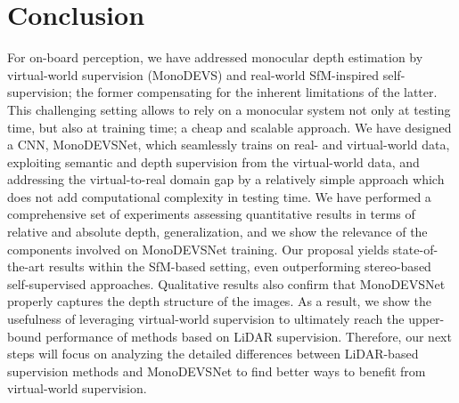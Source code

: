 \documentclass[journal]{IEEEtran}
\begin{document}
\section{Conclusion}
\label{sec:conclusion}
For on-board perception, we have addressed monocular depth estimation by virtual-world supervision (MonoDEVS) and real-world SfM-inspired self-supervision; the former compensating for the inherent limitations of the latter. This challenging setting allows to rely on a monocular system not only at testing time, but also at training time; a cheap and scalable approach. We have designed a CNN, MonoDEVSNet, which seamlessly trains on real- and virtual-world data, exploiting semantic and depth supervision from the virtual-world data, and addressing the virtual-to-real domain gap by a relatively simple approach which does not add computational complexity in testing time. We have performed a comprehensive set of experiments assessing quantitative results in terms of relative and absolute depth, generalization, and we show the relevance of the components involved on MonoDEVSNet training. Our proposal yields state-of-the-art results within the SfM-based setting, even outperforming stereo-based self-supervised approaches. Qualitative results also confirm that MonoDEVSNet properly captures the depth structure of the images. As a result, we show the usefulness of leveraging virtual-world supervision to ultimately reach the upper-bound performance of methods based on LiDAR supervision. Therefore, our next steps will focus on analyzing the detailed differences between LiDAR-based supervision methods and MonoDEVSNet to find better ways to benefit from virtual-world supervision.  


\ifCLASSOPTIONcaptionsoff
  \newpage
\fi











\end{document}

